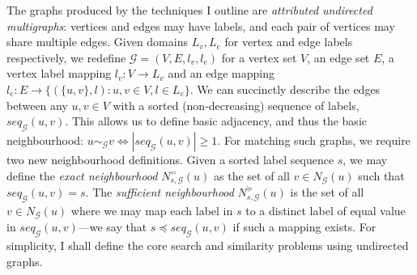 \documentclass{mpaper}
\begin{document}
The graphs produced by the techniques I outline are \emph{attributed undirected multigraphs}: vertices and edges may have labels, and each pair of vertices may share multiple edges.
Given domains $L_v, L_e$ for vertex and edge labels respectively, we redefine $\mathcal{G} = (V,E,l_v,l_e)$ for a vertex set $V$, an edge set $E$, a vertex label mapping $l_v: V \rightarrow L_v$ and an edge mapping $l_e: E \rightarrow \lbrace(\lbrace u,v \rbrace, l): u,v \in V, l \in L_e\rbrace$.
We can succinctly describe the edges between any $u, v \in V$ with a sorted (non-decreasing) sequence of labels, $seq_\mathcal{G}(u, v)$.
This allows us to define basic adjacency, and thus the basic neighbourhood: $u \sim_\mathcal{G} v \iff |seq_\mathcal{G}(u,v)| \ge 1$.
For matching such graphs, we require two new neighbourhood definitions.
Given a sorted label sequence $s$, we may define the \emph{exact neighbourhood} $N^{=}_{s,\mathcal{G}}(u)$ as the set of all $v \in N_\mathcal{G}(u)$ such that $seq_\mathcal{G}(u,v)=s$.
The \emph{sufficient neighbourhood} $N^{\succcurlyeq}_{s,\mathcal{G}}(u)$ is the set of all $v \in N_\mathcal{G}(u)$ where we may map each label in $s$ to a distinct label of equal value in $seq_\mathcal{G}(u,v)$---we say that $s \preccurlyeq seq_\mathcal{G}(u,v)$ if such a mapping exists.
For simplicity, I shall define the core search and similarity problems using undirected graphs.
\end{document}

